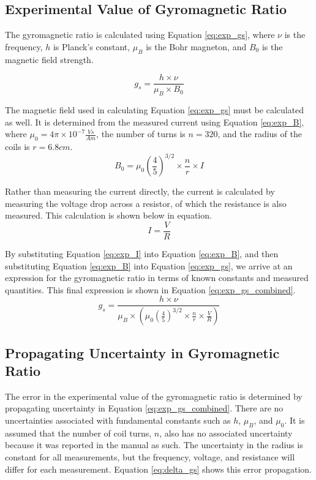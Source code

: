 \documentclass[a4paper]{article}
\begin{document}
\subsection{Experimental Value of Gyromagnetic Ratio}
\qq The gyromagnetic ratio is calculated using Equation \ref{eq:exp_gs},
where $\nu$ is the frequency, $h$ is Planck's constant, $\mu_B$ is the
Bohr magneton, and $B_0$ is the magnetic field strength.

\begin{equation}
\label{eq:exp_gs}
g_s = \frac{h \times \nu}{\mu_B \times B_0}
\end{equation}

\qq The magnetic field used in calculating Equation \ref{eq:exp_gs}
must be calculated as well. It is determined from the measured current
using Equation \ref{eq:exp_B}, where $\mu_0 = 4 \pi \times 10^{-7}
\frac{Vs}{Am}$, the number of turns is $n=320$, and the radius of the
coils is $r=6.8cm$.
\begin{equation}
\label{eq:exp_B}
B_0 = \mu_0 \left( \frac{4}{5} \right) ^{3/2} \times \frac{n}{r} \times I
\end{equation}

\qq Rather than measuring the current directly, the current is
calculated by measuring the voltage drop across a resistor, of which
the resistance is also measured. This calculation is shown below in
equation.
\begin{equation}
\label{eq:exp_I}
I = \frac{V}{R}
\end{equation}

\qq By substituting Equation \ref{eq:exp_I} into Equation \ref{eq:exp_B}, and
then substituting Equation \ref{eq:exp_B} into Equation
\ref{eq:exp_gs}, we arrive at an expression for the gyromagnetic ratio
in terms of known constants and measured quantities. This final
expression is shown in Equation \ref{eq:exp_gs_combined}.
\begin{equation}
\label{eq:exp_gs_combined}
g_s = \frac{h \times \nu}{\mu_B \times \left( \mu_0 \left( \frac{4}{5}
  \right) ^{3/2} \times \frac{n}{r} \times \frac{V}{R} \right) }
\end{equation}

\subsection{Propagating Uncertainty in Gyromagnetic Ratio}
\qq The error in the experimental value of the gyromagnetic ratio is
determined by propagating uncertainty in Equation
\ref{eq:exp_gs_combined}. There are no uncertainties associated with
fundamental constants such as $h$, $\mu_B$, and $\mu_0$. It is assumed
that the number of coil turns, $n$, also has no associated uncertainty
because it was reported in the manual as such. The uncertainty in the
radius is constant for all measurements, but the frequency, voltage,
and resistance will differ for each measurement. Equation
\ref{eq:delta_gs} shows this error propagation.
\end{document}
